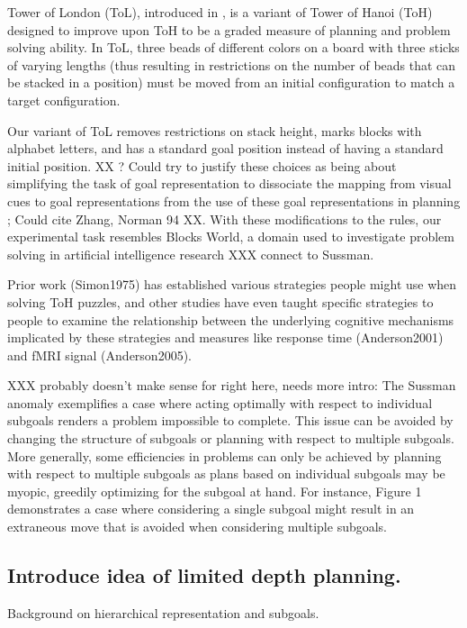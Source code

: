 \documentclass[10pt,letterpaper]{article}
\begin{document}
Tower of London (ToL), introduced in \cite{Shallice1982}, is a variant of Tower of Hanoi (ToH) designed to improve upon ToH to be a graded measure of planning and problem solving ability.  In ToL, three beads of different colors on a board with three sticks of varying lengths (thus resulting in restrictions on the number of beads that can be stacked in a position) must be moved from an initial configuration to match a target configuration.

Our variant of ToL removes restrictions on stack height, marks blocks with alphabet letters, and has a standard goal position instead of having a standard initial position. XX ? Could try to justify these choices as being about simplifying the task of goal representation to dissociate the mapping from visual cues to goal representations from the use of these goal representations in planning ; Could cite Zhang, Norman 94 XX. With these modifications to the rules, our experimental task resembles Blocks World, a domain used to investigate problem solving in artificial intelligence research XXX connect to Sussman.

Prior work (Simon1975) has established various strategies people might use when solving ToH puzzles, and other studies have even taught specific strategies to people to examine the relationship between the underlying cognitive mechanisms implicated by these strategies and measures like response time (Anderson2001) and fMRI signal (Anderson2005).

XXX probably doesn't make sense for right here, needs more intro: The Sussman anomaly exemplifies a case where acting optimally with respect to individual subgoals renders a problem impossible to complete. This issue can be avoided by changing the structure of subgoals or planning with respect to multiple subgoals. More generally, some efficiencies in problems can only be achieved by planning with respect to multiple subgoals as plans based on individual subgoals may be myopic, greedily optimizing for the subgoal at hand. For instance, Figure 1 demonstrates a case where considering a single subgoal might result in an extraneous move that is avoided when considering multiple subgoals.

\subsection{Introduce idea of limited depth planning.}

Background on hierarchical representation and subgoals.
\end{document}
